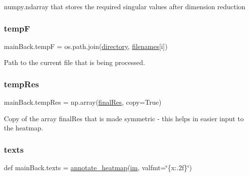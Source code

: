 numpy.\+ndarray that stores the required singular values after dimension reduction 

\mbox{\label{namespacemain_back_afe5cb30123edd8f4ce029bd8dc01a015}} 
\subsubsection{\texorpdfstring{tempF}{tempF}}
{\footnotesize\ttfamily main\+Back.\+tempF = os.\+path.\+join(\hyperlink{namespacemain_back_a1c89e94124b1c6fedb3a2c9fe2d299c4}{directory}, \hyperlink{namespacemain_back_ac066274638425ed709610bda61383714}{filenames}\mbox{[}i\mbox{]})}



Path to the current file that is being processed. 

\mbox{\label{namespacemain_back_affa4e447c02fd00737e9a39a8a84a3d1}} 
\subsubsection{\texorpdfstring{temp\+Res}{tempRes}}
{\footnotesize\ttfamily main\+Back.\+temp\+Res = np.\+array(\hyperlink{namespacemain_back_a864d25dd2821f3c46a914ace51562000}{final\+Res}, copy=True)}



Copy of the array final\+Res that is made symmetric -\/ this helps in easier input to the heatmap. 

\mbox{\label{namespacemain_back_a562674cbc45c1f945d00bcde6607f2e7}} 
\subsubsection{\texorpdfstring{texts}{texts}}
{\footnotesize\ttfamily def main\+Back.\+texts = \hyperlink{namespacemain_back_a7ad3aabd2ea6412049ac675944201dfa}{annotate\+\_\+heatmap}(\hyperlink{namespacemain_back_a2aabdc9357aa71da0c092014593e643e}{im}, valfmt=\char`\"{}\{x\+:.\+2f\}\char`\"{})}

\mbox{\label{namespacemain_back_abeb9019342053389159ea0497b6b89d2}} 
